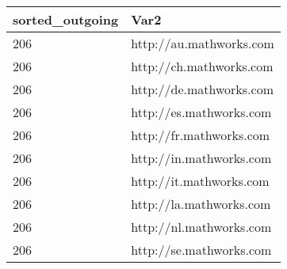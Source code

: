 \begin{tabular}{ll}
sorted_outgoing & Var2 \\ 
\hline 
206 & http://au.mathworks.com \\ 
206 & http://ch.mathworks.com \\ 
206 & http://de.mathworks.com \\ 
206 & http://es.mathworks.com \\ 
206 & http://fr.mathworks.com \\ 
206 & http://in.mathworks.com \\ 
206 & http://it.mathworks.com \\ 
206 & http://la.mathworks.com \\ 
206 & http://nl.mathworks.com \\ 
206 & http://se.mathworks.com \\ 
\hline 
\end{tabular}